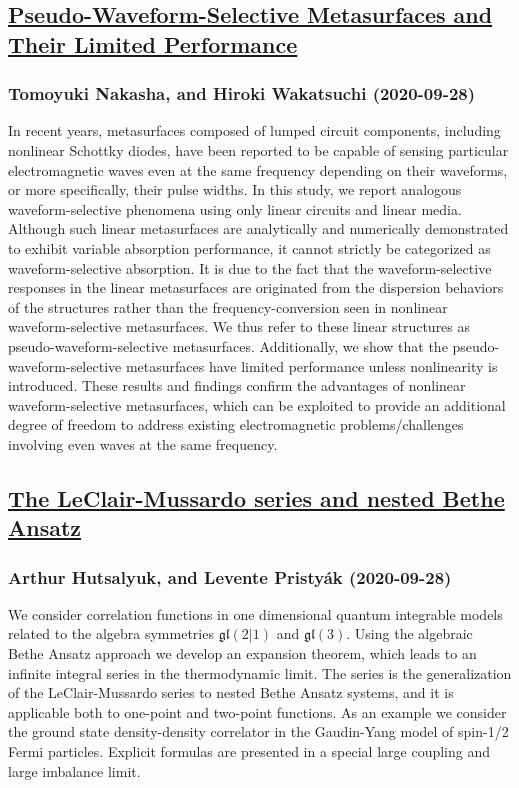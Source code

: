 \subsection*{\href{http://arxiv.org/abs/2009.13205v1}{Pseudo-Waveform-Selective Metasurfaces and Their Limited Performance}}
\subsubsection*{Tomoyuki Nakasha, and Hiroki Wakatsuchi (2020-09-28)}
In recent years, metasurfaces composed of lumped circuit components,
including nonlinear Schottky diodes, have been reported to be capable of
sensing particular electromagnetic waves even at the same frequency depending
on their waveforms, or more specifically, their pulse widths. In this study, we
report analogous waveform-selective phenomena using only linear circuits and
linear media. Although such linear metasurfaces are analytically and
numerically demonstrated to exhibit variable absorption performance, it cannot
strictly be categorized as waveform-selective absorption. It is due to the fact
that the waveform-selective responses in the linear metasurfaces are originated
from the dispersion behaviors of the structures rather than the
frequency-conversion seen in nonlinear waveform-selective metasurfaces. We thus
refer to these linear structures as pseudo-waveform-selective metasurfaces.
Additionally, we show that the pseudo-waveform-selective metasurfaces have
limited performance unless nonlinearity is introduced. These results and
findings confirm the advantages of nonlinear waveform-selective metasurfaces,
which can be exploited to provide an additional degree of freedom to address
existing electromagnetic problems/challenges involving even waves at the same
frequency.

\subsection*{\href{http://arxiv.org/abs/2009.13203v1}{The LeClair-Mussardo series and nested Bethe Ansatz}}
\subsubsection*{Arthur Hutsalyuk, and Levente Pristyák (2020-09-28)}
We consider correlation functions in one dimensional quantum integrable
models related to the algebra symmetries $\mathfrak{gl}(2|1)$ and
$\mathfrak{gl}(3)$. Using the algebraic Bethe Ansatz approach we develop an
expansion theorem, which leads to an infinite integral series in the
thermodynamic limit. The series is the generalization of the LeClair-Mussardo
series to nested Bethe Ansatz systems, and it is applicable both to one-point
and two-point functions. As an example we consider the ground state
density-density correlator in the Gaudin-Yang model of spin-1/2 Fermi
particles. Explicit formulas are presented in a special large coupling and
large imbalance limit.

